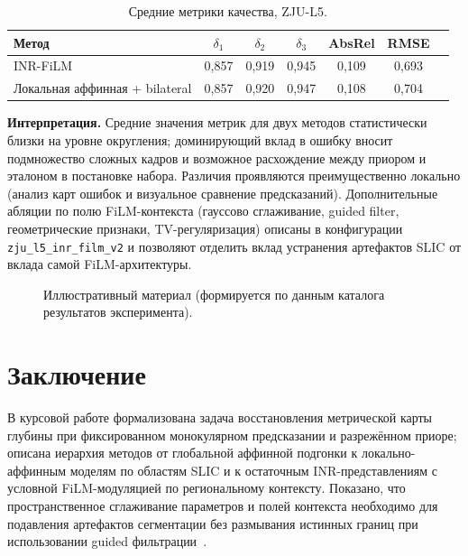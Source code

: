 \documentclass[12pt]{article}
\begin{document}
\begin{table}[h]
  \centering
  \begin{tabular}{lcccccc}
    \toprule
    Метод & $\delta_1$ & $\delta_2$ & $\delta_3$ & AbsRel & RMSE \\
    \midrule
    INR-FiLM & 0{,}857 & 0{,}919 & 0{,}945 & 0{,}109 & 0{,}693 \\
    Локальная аффинная + bilateral & 0{,}857 & 0{,}920 & 0{,}947 & 0{,}108 & 0{,}704 \\
    \bottomrule
  \end{tabular}
  \caption{Средние метрики качества, ZJU-L5.}
  \label{tab:zju}
\end{table}

\textbf{Интерпретация.} Средние значения метрик для двух методов статистически близки на уровне округления; доминирующий вклад в ошибку вносит подмножество сложных кадров и возможное расхождение между приором и эталоном в постановке набора. Различия проявляются преимущественно локально (анализ карт ошибок и визуальное сравнение предсказаний). Дополнительные абляции по полю FiLM-контекста (гауссово сглаживание, guided filter, геометрические признаки, TV-регуляризация) описаны в конфигурации \texttt{zju\_l5\_inr\_film\_v2} и позволяют отделить вклад устранения артефактов SLIC от вклада самой FiLM-архитектуры.

\begin{figure}[h]
  \centering
  \caption{Иллюстративный материал (формируется по данным каталога результатов эксперимента).}
  \label{fig:placeholder}
\end{figure}

\section{Заключение}

В курсовой работе формализована задача восстановления метрической карты глубины при фиксированном монокулярном предсказании и разрежённом приоре; описана иерархия методов от глобальной аффинной подгонки к локально-аффинным моделям по областям SLIC и к остаточным INR-представлениям с условной FiLM-модуляцией по региональному контексту. Показано, что пространственное сглаживание параметров и полей контекста необходимо для подавления артефактов сегментации без размывания истинных границ при использовании guided фильтрации~\cite{he2010guided}.
\end{document}
